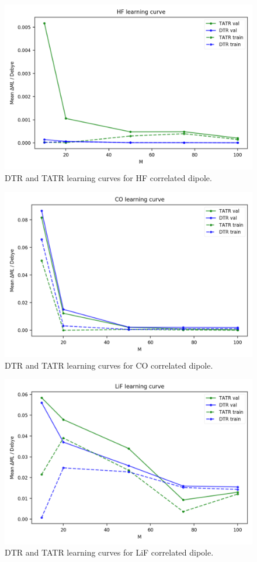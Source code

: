\begin{figure}
    \centering
    \includegraphics[scale=1.0]{p2/figures/si/HF_learn_d.png}
    \caption{DTR and TATR learning curves for HF correlated dipole.}
\end{figure}

\begin{figure}
    \centering
    \includegraphics[scale=1.0]{p2/figures/si/CO_learn_d.png}
    \caption{DTR and TATR learning curves for CO correlated dipole.}
\end{figure}

\begin{figure}
    \centering
    \includegraphics[scale=1.0]{p2/figures/si/LiF_learn_d.png}
    \caption{DTR and TATR learning curves for LiF correlated dipole.}
\end{figure}

